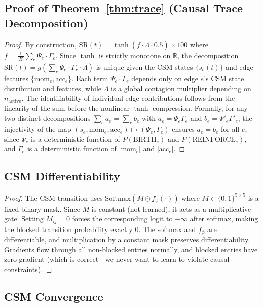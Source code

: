 \documentclass[11pt]{article}
\newcommand{\R}{\mathbb{R}}
\newcommand{\Softmax}{\mathrm{Softmax}}
\newcommand{\SR}{\mathrm{SR}}
\begin{document}
\subsection{Proof of Theorem~\ref{thm:trace} (Causal Trace Decomposition)}

\begin{proof}
By construction, $\SR(t) = \tanh(\bar{f} \cdot \Lambda \cdot 0.5) \times 100$ where $\bar{f} = \frac{1}{|E|}\sum_{e} \Psi_e \cdot \Gamma_e$. Since $\tanh$ is strictly monotone on $\R$, the decomposition $\SR(t) = g(\sum_e \Psi_e \cdot \Gamma_e \cdot \Lambda)$ is unique given the CSM states $\{s_e(t)\}$ and edge features $\{\text{mom}_e, \text{acc}_e\}$. Each term $\Psi_e \cdot \Gamma_e$ depends only on edge $e$'s CSM state distribution and features, while $\Lambda$ is a global contagion multiplier depending on $n_{\text{active}}$. The identifiability of individual edge contributions follows from the linearity of the sum before the nonlinear $\tanh$ compression. Formally, for any two distinct decompositions $\sum_e a_e = \sum_e b_e$ with $a_e = \Psi_e \Gamma_e$ and $b_e = \Psi'_e \Gamma'_e$, the injectivity of the map $(s_e, \text{mom}_e, \text{acc}_e) \mapsto (\Psi_e, \Gamma_e)$ ensures $a_e = b_e$ for all $e$, since $\Psi_e$ is a deterministic function of $P(\text{BIRTH}_e)$ and $P(\text{REINFORCE}_e)$, and $\Gamma_e$ is a deterministic function of $|\text{mom}_e|$ and $|\text{acc}_e|$.
\end{proof}

\subsection{CSM Differentiability}

\begin{proof}
The CSM transition uses $\Softmax(M \odot f_\phi(\cdot))$ where $M \in \{0,1\}^{5 \times 5}$ is a fixed binary mask. Since $M$ is constant (not learned), it acts as a multiplicative gate. Setting $M_{ij} = 0$ forces the corresponding logit to $-\infty$ after softmax, making the blocked transition probability exactly 0. The softmax and $f_\phi$ are differentiable, and multiplication by a constant mask preserves differentiability. Gradients flow through all non-blocked entries normally, and blocked entries have zero gradient (which is correct---we never want to learn to violate causal constraints).
\end{proof}

\subsection{CSM Convergence}
\end{document}
